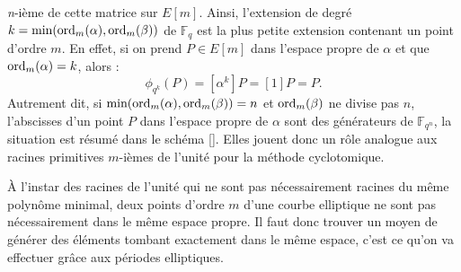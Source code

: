 \documentclass[a4paper]{article} %
\numberwithin{section}{part}
\numberwithin{equation}{section}
\newcommand\nroot[1]{\textit{#1}-ième}
\newcommand\GF[1]{\mathbb{F}_{#1}}
\newcommand\ord[2]{\textup{ord}_{#1}(#2)}
\begin{document}
\nroot{n} de cette matrice sur $E[m]$. Ainsi, l'extension de degré
$k = \textup{min}(\ord{m}{\alpha},\ord{m}{\beta})$ de 
$\GF{q}$ est la plus petite extension contenant un point d'ordre $m$. En
effet, si on prend $P\in E[m]$ dans l'espace propre de $\alpha$  et que 
$\ord{m}{\alpha} = k$, alors :
\begin{equation}
\phi_{q^k}(P) = [\alpha^k]P = [1]P = P.
\end{equation}
Autrement dit, si $\textup{min}(\ord{m}{\alpha},\ord{m}{\beta}) = n$ et
$\ord{m}{\beta}$ ne divise pas $n$, l'abscisses d'un point $P$ dans l'espace
propre de $\alpha$ sont des générateurs de $\GF{q^n}$, la situation est résumé
dans le schéma \ref{}. Elles jouent donc un rôle
analogue aux racines primitives $m$-ièmes de l'unité pour la méthode
cyclotomique.\par
À l'instar des racines de l'unité qui ne sont pas nécessairement racines du même
polynôme minimal, deux points d'ordre $m$ d'une courbe elliptique ne sont pas
nécessairement dans le même espace propre. Il faut donc trouver un moyen de
générer des éléments tombant exactement dans le même espace, c'est ce qu'on
va effectuer grâce aux périodes elliptiques.
\end{document}
